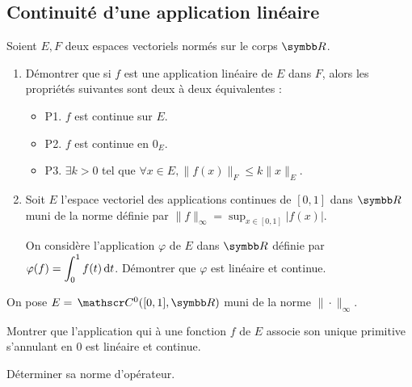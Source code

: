 \subsection{Continuité d'une application linéaire}

\begin{exercice}
    Soient $E, F$ deux espaces vectoriels normés sur le corps $\R$.
    \begin{enumerate}
        \item Démontrer que si $f$ est une application linéaire de $E$ dans $F$, alors les propriétés suivantes sont deux à deux équivalentes :
        \begin{itemize}
            \item P1. $f$ est continue sur $E$.
            \item P2. $f$ est continue en $0_{E}$.
            \item P3. $\exists k > 0$ tel que $\forall x \in E, \|f(x)\|_{F} \leqslant k \|x\|_{E}$.
        \end{itemize}
        \item Soit $E$ l'espace vectoriel des applications continues de $[0,1]$ 
            dans $\R$ muni de la norme définie par $\|f\|_{\infty} = \sup_{x \in [0,1]} |f(x)|$.

            On considère l'application $\varphi$ de $E$ dans $\R$ définie par $\displaystyle\varphi(f) = \int_{0}^{1} f(t) \,\mathrm{d}t$. 
            Démontrer que $\varphi$ est linéaire et continue.
    \end{enumerate}
\end{exercice}

\begin{exercice}
    On pose $E= \mc 0([0,1], \R)$ muni de la norme $\|\cdot\|_{\infty}$.
    
    Montrer que l'application qui à une fonction $f$ de $E$ associe son unique primitive s'annulant en 0 est linéaire et continue. 

    Déterminer sa norme d'opérateur.
\end{exercice}

